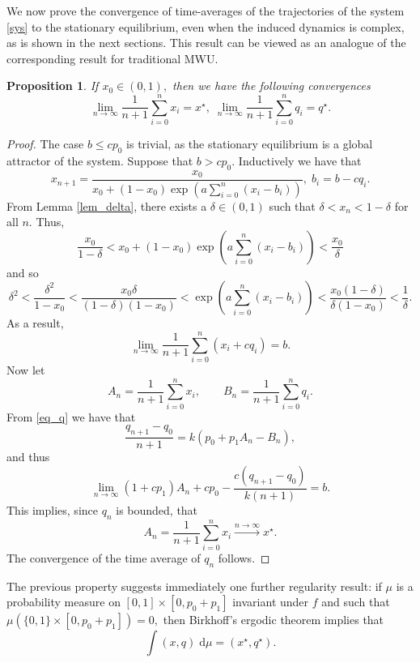 \documentclass{article}
\theoremstyle{plain}
\newtheorem{proposition}{Proposition}
\theoremstyle{definition}
\begin{document}
We now prove the convergence of time-averages of the trajectories of the system \eqref{sys} to the stationary equilibrium, even when the induced dynamics is complex, as is shown in the next sections. This result can be viewed as an analogue of the corresponding result for traditional MWU.

\begin{proposition}\label{prop1}
If $x_0\in (0,1),$ then we have the following convergences 
\begin{equation}
\lim_{n\to \infty} \frac{1}{n+1} \sum_{i=0}^n x_i =x^\star, \; \lim_{n\to \infty} \frac{1}{n+1} \sum_{i=0}^n q_i =q^\star. 
\label{cesaro}
\end{equation}
\end{proposition}
\begin{proof}
The case $b\leq cp_0$ is trivial, as the stationary equilibrium is a global attractor of the system. Suppose that $b>cp_0$. Inductively we have that 
$$
x_{n+1}=\frac{x_0}{x_0+(1-x_0)\exp{ \left(a \sum_{i=0}^n (x_i-b_i) \right)}}, \; b_i=b-cq_i.
$$
From Lemma \ref{lem_delta}, there exists a $\delta\in (0,1)$ such that $\delta<x_n<1-\delta$ for all $n$. Thus,
$$
\frac{x_0}{1-\delta}<x_0+(1-x_0)\exp{ \left(a \sum_{i=0}^n (x_i-b_i) \right)}<\frac{x_0}{\delta}
$$
and so
$$
\delta^2<\frac{\delta^2}{1-x_0}<\frac{x_0\delta}{(1-\delta)(1-x_0)}<\exp{ \left(a \sum_{i=0}^n (x_i-b_i) \right)}<\frac{x_0(1-\delta)}{\delta(1-x_0)}<\frac{1}{\delta}.
$$
As a result,
$$
\lim_{n \to \infty}\frac{1}{n+1} \sum_{i=0}^n (x_i+cq_i)=b.
$$
Now let 
$$
A_n=\frac{1}{n+1} \sum_{i=0}^n x_i, \qquad B_n=\frac{1}{n+1} \sum_{i=0}^n q_i.
$$
From \eqref{eq_q} we have that
$$
\frac{q_{n+1}-q_0}{n+1}=k(p_0+p_1A_n-B_n),
$$
and thus
$$
\lim_{n \to \infty} (1+cp_1)A_n+cp_0-\frac{c(q_{n+1}-q_0)}{k(n+1)} =b.
$$
This implies, since $q_n$ is bounded, that 
$$
A_n=\frac{1}{n+1} \sum_{i=0}^n x_i \xrightarrow{n \to \infty} x^\star.
$$
The convergence of the time average of $q_n$ follows.

\end{proof}
The previous property suggests immediately one further regularity result: if $\mu$ is a probability measure on $[0,1]\times[0,p_0+p_1]$ invariant under $f$ and such that $\mu\left(\{ 0,1\} \times [0,p_0+p_1] \right)=0,$ then Birkhoff's ergodic theorem implies that 
\[
\int (x,q) \;\mathrm{d}\mu= (x^\star, q^\star).
\]
\end{document}
